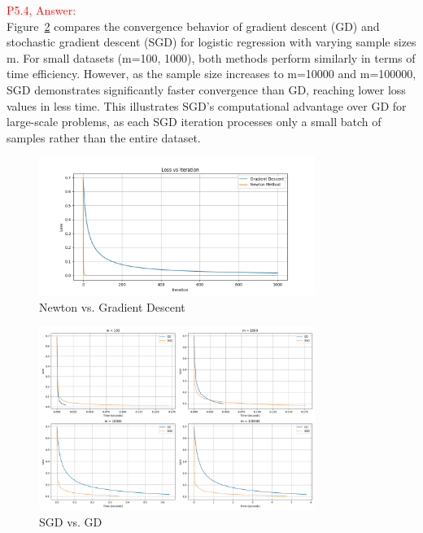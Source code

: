 \documentclass[11pt]{article}
\begin{document}
\textcolor{red}{P5.4, Answer:}\\

Figure~\ref{fig:p5_4} compares the convergence behavior of gradient descent (GD) and stochastic gradient descent (SGD) for logistic regression with varying sample sizes m. 
For small datasets (m=100, 1000), both methods perform similarly in terms of time efficiency. However, as the sample size increases to m=10000 and m=100000, 
SGD demonstrates significantly faster convergence than GD, reaching lower loss values in less time. This illustrates SGD's computational advantage over GD for 
large-scale problems, as each SGD iteration processes only a small batch of samples rather than the entire dataset.


\begin{figure}[h]
	\centering
	\includegraphics[width=0.8\textwidth]{p5_3.png}
	\caption{Newton vs. Gradient Descent}
	\label{fig:p5_3}
	\end{figure}

\begin{figure}[h]
	\centering
	\includegraphics[width=0.8\textwidth]{p5_4.png}
	\caption{SGD vs. GD}
	\label{fig:p5_4}
	\end{figure}

\newpage
\end{document}
